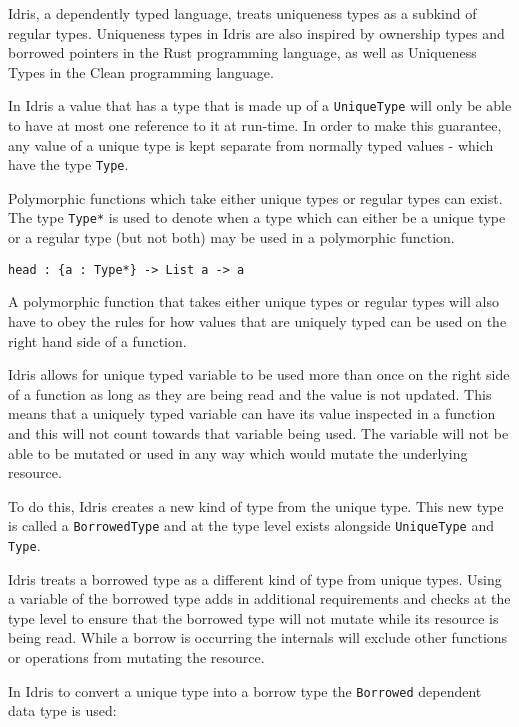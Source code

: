 \documentclass[onehalf,11pt]{beavtex}
\begin{document}
Idris, a dependently typed language, treats uniqueness types as a subkind of
regular types. Uniqueness types in Idris are also inspired by ownership types
and borrowed pointers in the Rust programming language, as well as Uniqueness
Types in the Clean programming language. %

In Idris a value that has a type that is made up of a \texttt{UniqueType}
will only be able to have at most one reference to it at run-time.
In order to make this guarantee, any value of a unique type is kept separate
from normally typed values - which have the type \texttt{Type}.

Polymorphic functions which take either unique types or regular
types can exist.
The type \texttt{Type*} is used to denote when a type which can either be a
unique type or a regular type (but not both) may be used in a polymorphic
function.

\begin{verbatim}
head : {a : Type*} -> List a -> a
\end{verbatim}

A polymorphic function that takes either unique types or regular types will also
have to obey the rules for how values that are uniquely typed can be used
on the right hand side of a function.


Idris allows for unique typed variable to be used more than once on the right
side of a function as long as they are being read and the value is not
updated.
This means that a uniquely typed variable can have its value inspected in a
function and this will not count towards that variable being used.
The variable will not be able to be mutated or used in any way which would
mutate the underlying resource.

To do this, Idris creates a new kind of type from the unique type.
This new type is called a \texttt{BorrowedType} and at
the type level exists alongside \texttt{UniqueType} and \texttt{Type}.

Idris treats a borrowed type as a different kind of type from unique types.
Using a variable of the borrowed type adds in additional
requirements and checks at the type level to ensure that the borrowed type
will not mutate while its resource is being read.
While a borrow is occurring the internals will exclude other functions or
operations from mutating the resource.

In Idris to convert a unique type into a borrow type the \texttt{Borrowed}
dependent data type is used:
\end{document}
